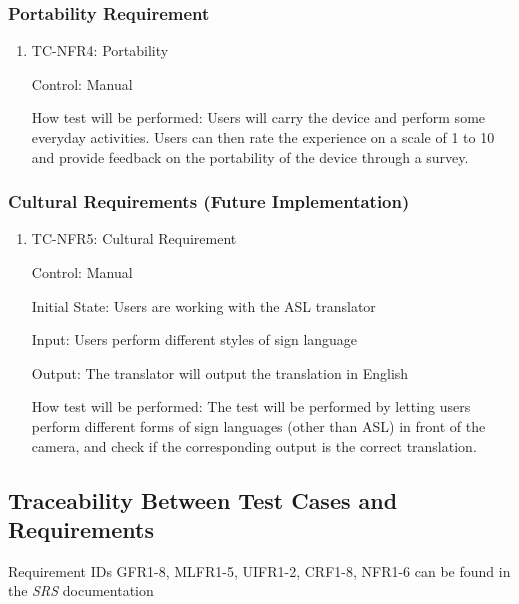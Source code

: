 \documentclass[12pt]{article}
\begin{document}
\subsubsection{Portability Requirement}

\begin{enumerate}

\item{TC-NFR4: Portability\\}

Control: Manual
					
How test will be performed: Users will carry the device and perform some everyday activities. Users can then rate the experience on a scale of 1 to 10 and provide feedback on the portability of the device through a survey.

\end{enumerate}

\subsubsection{Cultural Requirements (Future Implementation)}

\begin{enumerate}

\item{TC-NFR5: Cultural Requirement\\}

Control: Manual

Initial State: Users are working with the ASL translator
					
Input: Users perform different styles of sign language 
					
Output: The translator will output the translation in English
					
How test will be performed: The test will be performed by letting users perform different forms of sign languages (other than ASL) in front of the camera, and check if the corresponding output is the correct translation.

\end{enumerate}

\newpage

\subsection{Traceability Between Test Cases and Requirements}

Requirement IDs GFR1-8, MLFR1-5, UIFR1-2, CRF1-8, NFR1-6  can be found in the \emph{SRS} \citep{SRS} documentation\\
~\\
\end{document}
